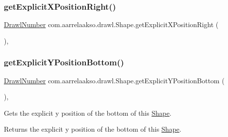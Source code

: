 \subsubsection{\texorpdfstring{get\+Explicit\+X\+Position\+Right()}{getExplicitXPositionRight()}}
{\footnotesize\ttfamily \hyperlink{classcom_1_1aarrelaakso_1_1drawl_1_1_drawl_number}{Drawl\+Number} com.\+aarrelaakso.\+drawl.\+Shape.\+get\+Explicit\+X\+Position\+Right (\begin{DoxyParamCaption}{ }\end{DoxyParamCaption})\hspace{0.3cm}{\ttfamily [protected]}, {\ttfamily [inherited]}}

\mbox{\label{classcom_1_1aarrelaakso_1_1drawl_1_1_shape_aa26eb0263851ed8f8221bf3740e6e584}} 
\subsubsection{\texorpdfstring{get\+Explicit\+Y\+Position\+Bottom()}{getExplicitYPositionBottom()}}
{\footnotesize\ttfamily \hyperlink{classcom_1_1aarrelaakso_1_1drawl_1_1_drawl_number}{Drawl\+Number} com.\+aarrelaakso.\+drawl.\+Shape.\+get\+Explicit\+Y\+Position\+Bottom (\begin{DoxyParamCaption}{ }\end{DoxyParamCaption})\hspace{0.3cm}{\ttfamily [protected]}, {\ttfamily [inherited]}}



Gets the explicit y position of the bottom of this \hyperlink{classcom_1_1aarrelaakso_1_1drawl_1_1_shape}{Shape}. 

\begin{DoxyReturn}{Returns}
the explicit y position of the bottom of this \hyperlink{classcom_1_1aarrelaakso_1_1drawl_1_1_shape}{Shape}. 
\end{DoxyReturn}
\mbox{\label{classcom_1_1aarrelaakso_1_1drawl_1_1_shape_a602cb73f783f2856fa81e82bf7792263}} 
